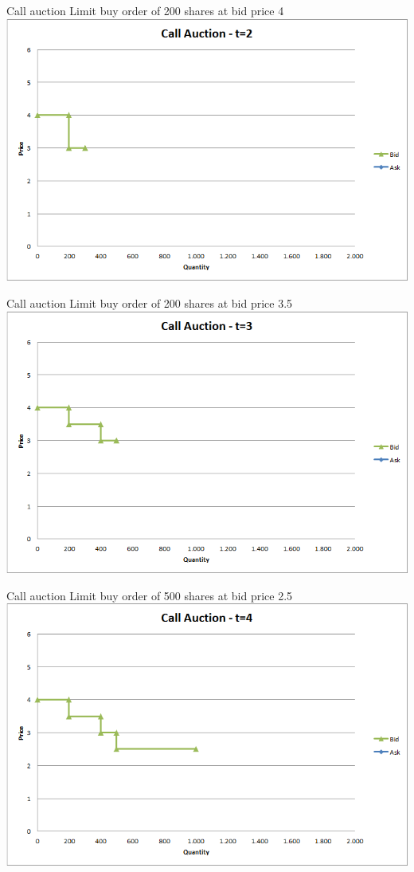 \documentclass[english,10pt]{beamer}
\theoremstyle{definition}
\begin{document}
\begin{frame}{Call auction}
	Limit buy order of 200 shares at bid price 4
	\quad
	\center
	\includegraphics[width=.75\linewidth]{pics/Call_t2}
\end{frame}


\begin{frame}{Call auction}
	Limit buy order of 200 shares at bid price 3.5
	\quad
	\center
	\includegraphics[width=.75\linewidth]{pics/Call_t3}
\end{frame}


\begin{frame}{Call auction}
	Limit buy order of 500 shares at bid price 2.5
	\quad
	\center
	\includegraphics[width=.75\linewidth]{pics/Call_t4}
\end{frame}
\end{document}
